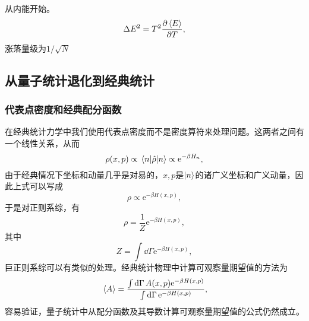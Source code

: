 \documentclass[hyperref, UTF8, a4paper]{ctexart}
\newcommand*{\ee}{\mathrm{e}}
\begin{document}

从内能开始。
\begin{equation}
    \Delta E^2 = T^2 \pdv{\expval*{E}}{T},
\end{equation}
涨落量级为$1/\sqrt{N}$

\subsection{从量子统计退化到经典统计}

\subsubsection{代表点密度和经典配分函数}

在经典统计力学中我们使用代表点密度而不是密度算符来处理问题。这两者之间有一个线性关系，从而
\[
    \rho(x, p) \propto \mel{n}{\hat{\rho}}{n} \propto \ee^{- \beta H_n},
\]
由于经典情况下坐标和动量几乎是对易的，$x, p$是$\ket{n}$的诸广义坐标和广义动量，因此上式可以写成
\[
    \rho \propto \ee^{-\beta H(x, p)},
\]
于是对正则系综，有
\begin{equation}
    \rho = \frac{1}{Z} \ee^{- \beta H(x, p)},
\end{equation}
其中
\begin{equation}
    Z = \int \dd{\Gamma} \ee^{- \beta H(x, p)},
    \label{eq:classical-partition-function}
\end{equation}
巨正则系综可以有类似的处理。经典统计物理中计算可观察量期望值的方法为
\begin{equation}
    \expval*{A} = \frac{\int \dd{\Gamma} A(x, p) \ee^{-\beta H(x, p)}}{\int \dd{\Gamma} \ee^{-\beta H(x, p)}},
\end{equation}
容易验证，量子统计中从配分函数及其导数计算可观察量期望值的公式仍然成立。
\end{document}
